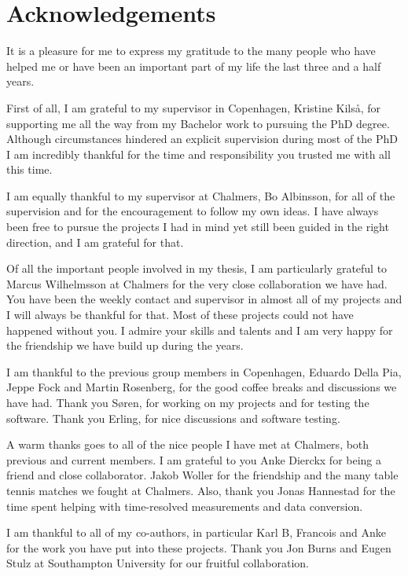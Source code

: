 \cleardoublepage
\chapter{Acknowledgements}
\vspace*{1cm}
It is a pleasure for me to express my gratitude to the many people who have helped me or have been an important part of my life the last three and a half years.

First of all, I am grateful to my supervisor in Copenhagen, Kristine Kilså, for supporting me all the way from my Bachelor work to pursuing the PhD degree. Although circumstances hindered an explicit supervision during most of the PhD I am incredibly thankful for the time and responsibility you trusted me with all this time.

I am equally thankful to my supervisor at Chalmers, Bo Albinsson, for all of the supervision and for the encouragement to follow my own ideas. I have always been free to pursue the projects I had in mind yet still been guided in the right direction, and I am grateful for that.

Of all the important people involved in my thesis, I am particularly grateful to Marcus Wilhelmsson at Chalmers for the very close collaboration we have had. You have been the weekly contact and supervisor in almost all of my projects and I will always be thankful for that. Most of these projects could not have happened without you. I admire your skills and talents and I am very happy for the friendship we have build up during the years.

I am thankful to the previous group members in Copenhagen, Eduardo Della Pia, Jeppe Fock and Martin Rosenberg, for the good coffee breaks and discussions we have had. Thank you Søren, for working on my projects and for testing the software. Thank you Erling, for nice discussions and software testing.

A warm thanks goes to all of the nice people I have met at Chalmers, both previous and current members. I am grateful to you Anke Dierckx for being a friend and close collaborator. Jakob Woller for the friendship and the many table tennis matches  we fought at Chalmers. Also, thank you Jonas Hannestad for the time spent helping with time-resolved measurements and data conversion.

I am thankful to all of my co-authors, in particular Karl B, Francois and Anke for the work you have put into these projects. Thank you Jon Burns and Eugen Stulz at Southampton University for our fruitful collaboration.

